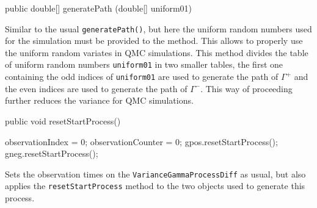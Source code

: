 \begin{code}

   public double[] generatePath (double[] uniform01) 
\end{code}
\begin{tabb}
Similar to the usual \texttt{generatePath()}, but here the uniform
random numbers used for the simulation must be provided to the method.  This
allows to properly use the uniform random variates in QMC simulations.
This method divides the table of uniform random
numbers \texttt{uniform01} in two smaller tables, the first one containing
the odd indices of \texttt{uniform01} are used to generate the path of $\Gamma^{+}$
and the even indices are used to generate the path of  $\Gamma^{-}$.
This way of proceeding further reduces the
variance for QMC simulations.
\end{tabb}
\begin{code}

   public void resetStartProcess() \begin{hide} {
        observationIndex   = 0;
        observationCounter = 0;
        gpos.resetStartProcess();
        gneg.resetStartProcess();
    }\end{hide}
\end{code}
\begin{tabb} Sets the observation times on the \texttt{VarianceGammaProcessDiff}
as usual, but also applies the \texttt{resetStartProcess} method to the two
 objects used to generate this process.
\end{tabb}
